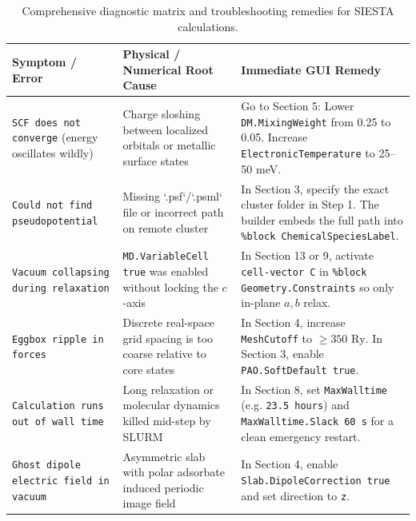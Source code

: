 \documentclass[11pt,a4paper]{article}
\begin{document}
\begin{table}[h]
\centering
\small
\begin{tabular}{p{4.2cm} p{5.5cm} p{6.8cm}}
\toprule
\textbf{Symptom / Error} & \textbf{Physical / Numerical Root Cause} & \textbf{Immediate GUI Remedy} \\
\midrule
\texttt{SCF does not converge} (energy oscillates wildly) & Charge sloshing between localized orbitals or metallic surface states & Go to Section 5: Lower \texttt{DM.MixingWeight} from 0.25 to 0.05. Increase \texttt{ElectronicTemperature} to 25–50 meV. \\
\addlinespace
\texttt{Could not find pseudopotential} & Missing `.psf`/`.psml` file or incorrect path on remote cluster & In Section 3, specify the exact cluster folder in Step 1. The builder embeds the full path into \texttt{\%block ChemicalSpeciesLabel}. \\
\addlinespace
\texttt{Vacuum collapsing during relaxation} & \texttt{MD.VariableCell true} was enabled without locking the $c$-axis & In Section 13 or 9, activate \texttt{cell-vector C} in \texttt{\%block Geometry.Constraints} so only in-plane $a, b$ relax. \\
\addlinespace
\texttt{Eggbox ripple in forces} & Discrete real-space grid spacing is too coarse relative to core states & In Section 4, increase \texttt{MeshCutoff} to $\ge 350\text{ Ry}$. In Section 3, enable \texttt{PAO.SoftDefault true}. \\
\addlinespace
\texttt{Calculation runs out of wall time} & Long relaxation or molecular dynamics killed mid-step by SLURM & In Section 8, set \texttt{MaxWalltime} (e.g. \texttt{23.5 hours}) and \texttt{MaxWalltime.Slack 60 s} for a clean emergency restart. \\
\addlinespace
\texttt{Ghost dipole electric field in vacuum} & Asymmetric slab with polar adsorbate induced periodic image field & In Section 4, enable \texttt{Slab.DipoleCorrection true} and set direction to \texttt{z}. \\
\bottomrule
\end{tabular}
\caption{Comprehensive diagnostic matrix and troubleshooting remedies for SIESTA calculations.}
\end{table}
\end{document}
